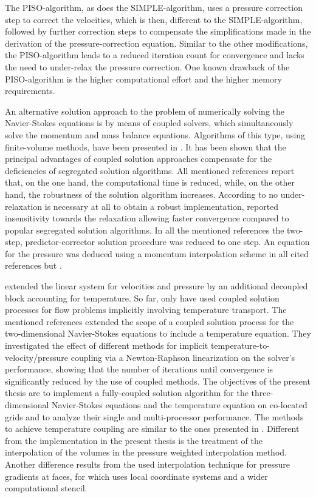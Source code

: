 The PISO-algorithm, as does the SIMPLE-algorithm, uses a pressure correction step to correct the velocities, which is then, different to the SIMPLE-algorithm, followed by further correction steps to compensate the simplifications made in the derivation of the pressure-correction equation. Similar to the other modifications, the PISO-algorithm leads to a reduced iteration count for convergence and lacks the need to under-relax the pressure correction. One known drawback of the PISO-algorithm is the higher computational effort and the higher memory requirements.

An alternative solution approach to the problem of numerically solving the Navier-Stokes equations is by means of coupled solvers, which simultaneously solve the momentum and mass balance equations. Algorithms of this type, using finite-volume methods, have been presented in \cite{chen10,darwish09,falk13,galpin86,klaij13,mangani14,vakilipour12}. It has been shown \cite{darwish09} that the principal advantages of coupled solution approaches compensate for the deficiencies of segregated solution algorithms. All mentioned references report that, on the one hand, the computational time is reduced, while, on the other hand, the robustness of the solution algorithm increases. According to \cite{darwish09} no under-relaxation is necessary at all to obtain a robust implementation, \cite{galpin86} reported insensitivity towards the relaxation allowing faster convergence compared to popular segregated solution algorithms. In all the mentioned references the two-step, predictor-corrector solution procedure was reduced to one step. An equation for the pressure was deduced using a momentum interpolation scheme \cite{rhie82} in all cited references but \cite{galpin86}.

\cite{chen10} extended the linear system for velocities and pressure by an additional decoupled block accounting for temperature. So far, only \cite{galpin86,vakilipour12} have used coupled solution processes for flow problems implicitly involving temperature transport. The mentioned references extended the scope of a coupled solution process for the two-dimensional Navier-Stokes equations to include a temperature equation. They investigated the effect of different methods for implicit temperature-to-velocity/pressure coupling via a Newton-Raphson linearization on the solver's performance, showing that the number of iterations until convergence is significantly reduced by the use of coupled methods. The objectives of the present thesis are to implement a fully-coupled solution algorithm for the three-dimensional Navier-Stokes equations and the temperature equation on co-located grids and to analyze their single and multi-processor performance. The methods to achieve temperature coupling are similar to the ones presented in \cite{vakilipour12}. Different from the implementation in the present thesis is the treatment of the interpolation of the volumes in the pressure weighted interpolation method. Another difference results from the used interpolation technique for pressure gradients at faces, for which \cite{vakilipour12} uses local coordinate systems and a wider computational stencil.

